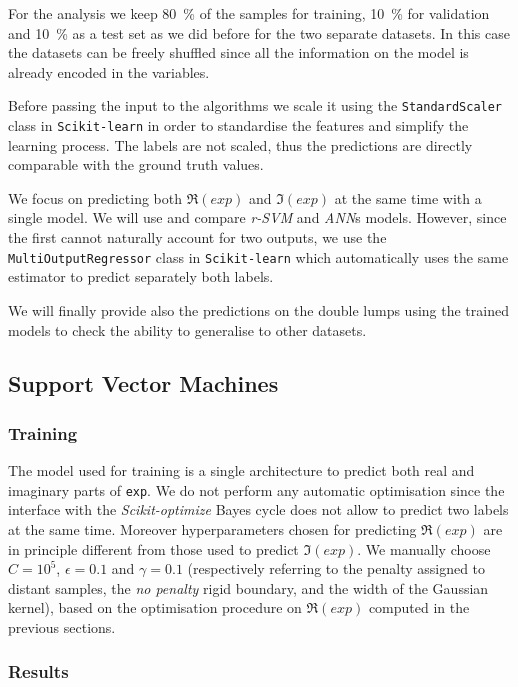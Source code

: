 For the analysis we keep \SI{80}{\percent} of the samples for training, \SI{10}{\percent} for validation and \SI{10}{\percent} as a test set as we did before for the two separate datasets.
In this case the datasets can be freely shuffled since all the information on the model is already encoded in the variables.

Before passing the input to the algorithms we scale it using the \texttt{StandardScaler} class in \texttt{Scikit-learn} in order to standardise the features and simplify the learning process.
The labels are not scaled, thus the predictions are directly comparable with the ground truth values.

We focus on predicting both $\Re(exp)$ and $\Im(exp)$ at the same time with a single model.
We will use and compare \emph{r-SVM} and \emph{ANN}s models.
However, since the first cannot naturally account for two outputs, we use the \texttt{MultiOutputRegressor} class in \texttt{Scikit-learn} which automatically uses the same estimator to predict separately both labels.

We will finally provide also the predictions on the double lumps using the trained models to check the ability to generalise to other datasets.


\subsection{Support Vector Machines}

\subsubsection{Training}

The model used for training is a single architecture to predict both real and imaginary parts of \texttt{exp}.
We do not perform any automatic optimisation since the interface with the \emph{Scikit-optimize} Bayes cycle does not allow to predict two labels at the same time.
Moreover hyperparameters chosen for predicting $\Re(exp)$ are in principle different from those used to predict $\Im(exp)$.
We manually choose $C = 10^5$, $\epsilon= 0.1$ and $\gamma = 0.1$ (respectively referring to the penalty assigned to distant samples, the \emph{no penalty} rigid boundary, and the width of the Gaussian kernel), based on the optimisation procedure on $\Re(exp)$ computed in the previous sections.


\subsubsection{Results}

